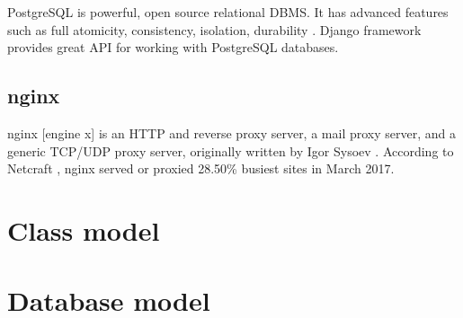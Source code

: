 PostgreSQL is powerful, open source relational \ac{DBMS}. It has advanced features such as full
atomicity, consistency, isolation, durability \cite{postgres}. Django framework provides great \ac{API} for working
with PostgreSQL databases.

\subsection{nginx}
nginx [engine x] is an HTTP and reverse proxy server, a mail proxy server, and a generic TCP/UDP proxy server,
originally written by Igor Sysoev \cite{nginx}. According to Netcraft \cite{netcraft}, nginx served or proxied 28.50\%
busiest sites in March 2017.


\section{Class model}




\section{Database model}

